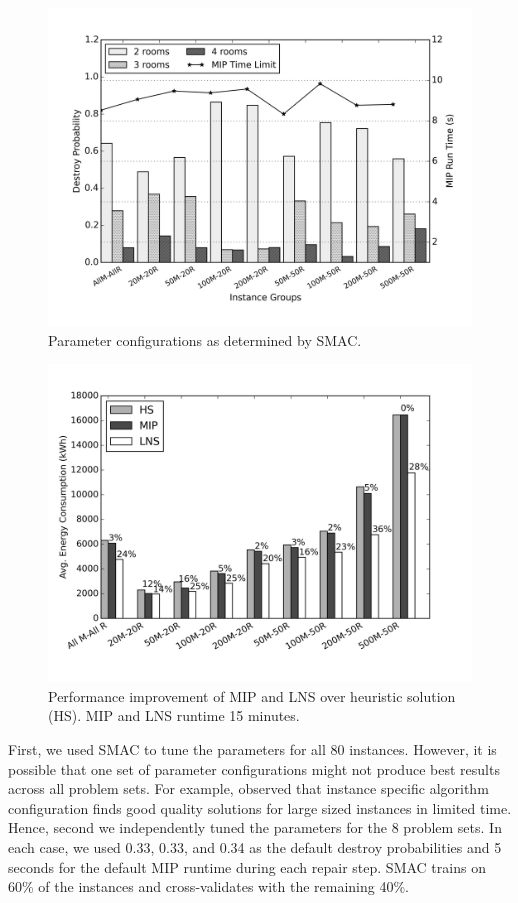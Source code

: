 \begin{figure}
	\centering
		\includegraphics[width=0.9\linewidth]{figs/mipdestroy_1027.png}
	\caption{Parameter configurations as determined by SMAC.}
	\vspace*{-2ex}
	\label{fig:mipdestroy_0907}
\end{figure}

\begin{figure}
\centering	
	\includegraphics[width=0.9\linewidth]{figs/lnsmip_mspec_mspec900_shortHS_maxdata500.png}
	\caption{Performance improvement of MIP and LNS over heuristic solution (HS). MIP and LNS runtime 15 minutes.}
	\vspace*{-2ex}
\label{fig:mspec_mspec_900}
\end{figure}

First, we used SMAC to tune the parameters for all 80 instances. %
However, it is possible that one set of parameter configurations might not produce best results across all problem sets.
For example, \cite{malitsky2013tuning} observed that instance specific algorithm configuration finds good quality solutions for large sized instances in limited time. Hence, second we independently tuned the parameters for the 8 problem sets. In each case, we used 0.33, 0.33, and 0.34 as the default destroy probabilities and 5 seconds for the default MIP runtime during each repair step. SMAC trains on 60\% of the instances and cross-validates with the remaining 40\%.

